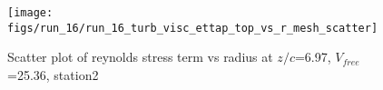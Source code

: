 \begin{figure}[H]
\centering
\texttt{[image: figs/run\_16/run\_16\_turb\_visc\_ettap\_top\_vs\_r\_mesh\_scatter]}
\caption{Scatter plot of reynolds stress term vs radius at $z/c$=6.97, $V_{free}$=25.36, station2}
\label{fig:run_16_turb_visc_ettap_top_vs_r_mesh_scatter}
\end{figure}


